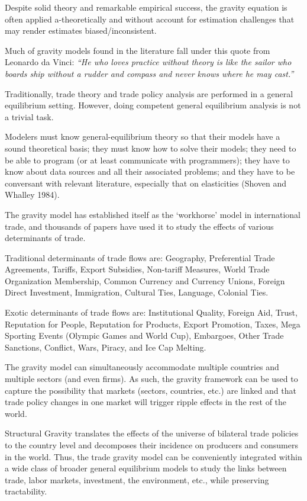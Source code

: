\documentclass[12pt,reqno,oneside,pdftex]{formato-puc/puctesis} %
\begin{document}
Despite solid theory and remarkable empirical success, the gravity
equation is often applied a-theoretically and without account for
estimation challenges that may render estimates biased/inconsistent.

Much of gravity models found in the literature fall under this quote
from Leonardo da Vinci: \emph{``He who loves practice without theory is
like the sailor who boards ship without a rudder and compass and never
knows where he may cast.''}

Traditionally, trade theory and trade policy analysis are performed in a
general equilibrium setting. However, doing competent general
equilibrium analysis is not a trivial task.

Modelers must know general-equilibrium theory so that their models have
a sound theoretical basis; they must know how to solve their models;
they need to be able to program (or at least communicate with
programmers); they have to know about data sources and all their
associated problems; and they have to be conversant with relevant
literature, especially that on elasticities (Shoven and Whalley 1984).

The gravity model has established itself as the `workhorse' model in
international trade, and thousands of papers have used it to study the
effects of various determinants of trade.

Traditional determinants of trade flows are: Geography, Preferential
Trade Agreements, Tariffs, Export Subsidies, Non-tariff Measures, World
Trade Organization Membership, Common Currency and Currency Unions,
Foreign Direct Investment, Immigration, Cultural Ties, Language,
Colonial Ties.

Exotic determinants of trade flows are: Institutional Quality, Foreign
Aid, Trust, Reputation for People, Reputation for Products, Export
Promotion, Taxes, Mega Sporting Events (Olympic Games and World Cup),
Embargoes, Other Trade Sanctions, Conflict, Wars, Piracy, and Ice Cap
Melting.

The gravity model can simultaneously accommodate multiple countries and
multiple sectors (and even firms). As such, the gravity framework can be
used to capture the possibility that markets (sectors, countries, etc.)
are linked and that trade policy changes in one market will trigger
ripple effects in the rest of the world.

Structural Gravity translates the effects of the universe of bilateral
trade policies to the country level and decomposes their incidence on
producers and consumers in the world. Thus, the trade gravity model can
be conveniently integrated within a wide class of broader general
equilibrium models to study the links between trade, labor markets,
investment, the environment, etc., while preserving tractability.
\end{document}
